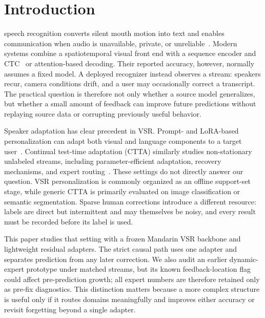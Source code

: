 \section{Introduction}
\label{sec:introduction}

 speech recognition converts silent mouth motion into text and enables communication when audio is unavailable, private, or unreliable~\cite{potamianos2003recent,ma2022visual}. Modern systems combine a spatiotemporal visual front end with a sequence encoder and CTC~\cite{graves2006ctc} or attention-based decoding. Their reported accuracy, however, normally assumes a fixed model. A deployed recognizer instead observes a stream: speakers recur, camera conditions drift, and a user may occasionally correct a transcript. The practical question is therefore not only whether a source model generalizes, but whether a small amount of feedback can improve future predictions without replaying source data or corrupting previously useful behavior.

Speaker adaptation has clear precedent in VSR. Prompt- and LoRA-based personalization can adapt both visual and language components to a target user~\cite{yeo2024personalized}. Continual test-time adaptation (CTTA) similarly studies non-stationary unlabeled streams, including parameter-efficient adaptation, recovery mechanisms, and expert routing~\cite{niu2022eata,wang2022cotta,lee2024becotta,cui2025paint}. These settings do not directly answer our question. VSR personalization is commonly organized as an offline support-set stage, while generic CTTA is primarily evaluated on image classification or semantic segmentation. Sparse human corrections introduce a different resource: labels are direct but intermittent and may themselves be noisy, and every result must be recorded before its label is used.

This paper studies that setting with a frozen Mandarin VSR backbone and lightweight residual adapters. The strict causal path uses one adapter and separates prediction from any later correction. We also audit an earlier dynamic-expert prototype under matched streams, but its known feedback-location flag could affect pre-prediction growth; all expert numbers are therefore retained only as pre-fix diagnostics. This distinction matters because a more complex structure is useful only if it routes domains meaningfully and improves either accuracy or revisit forgetting beyond a single adapter.

